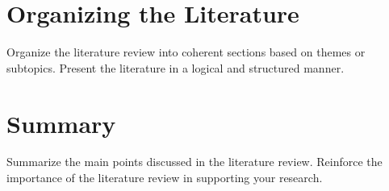\section*{Organizing the Literature}

Organize the literature review into coherent sections based on themes or subtopics. Present the literature in a logical and structured manner.

\section*{Summary}

Summarize the main points discussed in the literature review. Reinforce the importance of the literature review in supporting your research.

